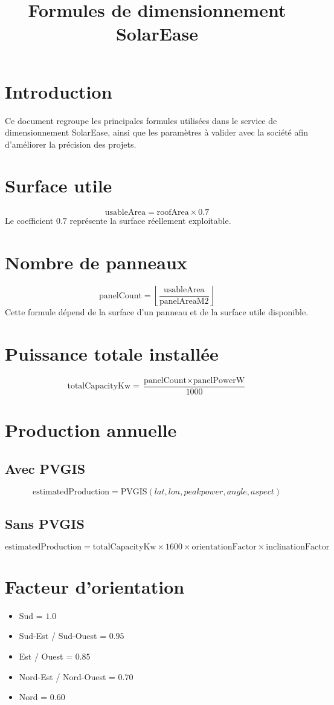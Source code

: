 \documentclass[12pt,a4paper]{article}
\title{Formules de dimensionnement SolarEase}
\author{}
\date{}
\begin{document}
\maketitle

\section*{Introduction}
Ce document regroupe les principales formules utilisées dans le service de dimensionnement SolarEase, ainsi que les paramètres à valider avec la société afin d'améliorer la précision des projets.

\section{Surface utile}
\[
\text{usableArea} = \text{roofArea} \times 0.7
\]
Le coefficient $0.7$ représente la surface réellement exploitable.

\section{Nombre de panneaux}
\[
\text{panelCount} = \left\lfloor \frac{\text{usableArea}}{\text{panelAreaM2}} \right\rfloor
\]
Cette formule dépend de la surface d'un panneau et de la surface utile disponible.

\section{Puissance totale installée}
\[
\text{totalCapacityKw} = \frac{\text{panelCount} \times \text{panelPowerW}}{1000}
\]

\section{Production annuelle}
\subsection{Avec PVGIS}
\[
\text{estimatedProduction} = \text{PVGIS}(lat, lon, peakpower, angle, aspect)
\]

\subsection{Sans PVGIS}
\[
\text{estimatedProduction} = \text{totalCapacityKw} \times 1600 \times \text{orientationFactor} \times \text{inclinationFactor}
\]

\section{Facteur d'orientation}
\begin{itemize}[leftmargin=1.5cm]
    \item Sud = $1.0$
    \item Sud-Est / Sud-Ouest = $0.95$
    \item Est / Ouest = $0.85$
    \item Nord-Est / Nord-Ouest = $0.70$
    \item Nord = $0.60$
\end{itemize}
\end{document}

